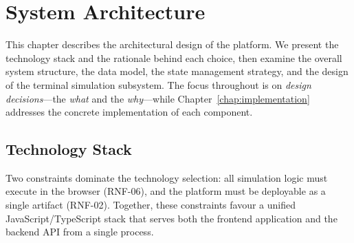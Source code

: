 \chapter{System Architecture}\label{chap:architecture}

This chapter describes the architectural design of the \pcbctf{} platform. We present the technology stack and the rationale behind each choice, then examine the overall system structure, the data model, the state management strategy, and the design of the terminal simulation subsystem. The focus throughout is on \emph{design decisions}---the \emph{what} and the \emph{why}---while Chapter~\ref{chap:implementation} addresses the concrete implementation of each component.

\section{Technology Stack}\label{sec:techstack}

Two constraints dominate the technology selection: all simulation logic must execute in the browser (RNF-06), and the platform must be deployable as a single artifact (RNF-02). Together, these constraints favour a unified JavaScript/TypeScript stack that serves both the frontend application and the backend API from a single process.

